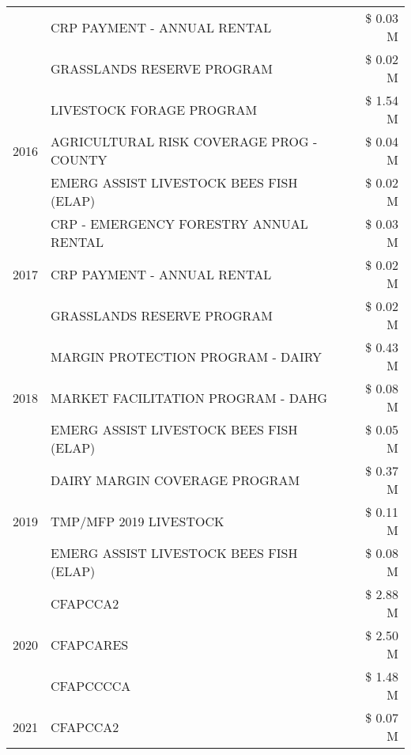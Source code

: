 \begin{tabular}{llr}
 & CRP PAYMENT - ANNUAL RENTAL & \$ 0.03 M \\
 & GRASSLANDS RESERVE PROGRAM & \$ 0.02 M \\
\cline{1-3}
\multirow[t]{3}{*}{2016} & LIVESTOCK FORAGE PROGRAM & \$ 1.54 M \\
 & AGRICULTURAL RISK COVERAGE PROG - COUNTY & \$ 0.04 M \\
 & EMERG ASSIST LIVESTOCK BEES FISH (ELAP) & \$ 0.02 M \\
\cline{1-3}
\multirow[t]{3}{*}{2017} & CRP - EMERGENCY FORESTRY ANNUAL RENTAL & \$ 0.03 M \\
 & CRP PAYMENT - ANNUAL RENTAL & \$ 0.02 M \\
 & GRASSLANDS RESERVE PROGRAM & \$ 0.02 M \\
\cline{1-3}
\multirow[t]{3}{*}{2018} & MARGIN PROTECTION PROGRAM - DAIRY & \$ 0.43 M \\
 & MARKET FACILITATION PROGRAM - DAHG & \$ 0.08 M \\
 & EMERG ASSIST LIVESTOCK BEES FISH (ELAP) & \$ 0.05 M \\
\cline{1-3}
\multirow[t]{3}{*}{2019} & DAIRY MARGIN COVERAGE PROGRAM & \$ 0.37 M \\
 & TMP/MFP 2019 LIVESTOCK & \$ 0.11 M \\
 & EMERG ASSIST LIVESTOCK BEES FISH (ELAP) & \$ 0.08 M \\
\cline{1-3}
\multirow[t]{3}{*}{2020} & CFAPCCA2 & \$ 2.88 M \\
 & CFAPCARES & \$ 2.50 M \\
 & CFAPCCCCA & \$ 1.48 M \\
\cline{1-3}
2021 & CFAPCCA2 & \$ 0.07 M \\
\cline{1-3}
\bottomrule
\end{tabular}
